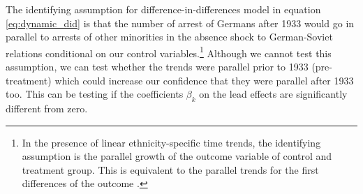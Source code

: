 

The identifying assumption for difference-in-differences model in equation \ref{eq:dynamic_did} is that the number of arrest of Germans after 1933 would go in parallel to arrests of other minorities in the absence shock to German-Soviet relations conditional on our control variables.\footnote{In the presence of linear ethnicity-specific time trends, the identifying assumption  is the parallel growth of the outcome variable of control and treatment group. This is equivalent to the parallel trends for the first differences of the outcome \citep{mora_alternative_2019}. } Although we cannot test this assumption, we can test whether the trends were parallel prior to 1933 (pre-treatment) which could increase our confidence that they were parallel after 1933 too. This can be testing if the coefficients $\beta_k$ on the lead effects are significantly different from zero.  


